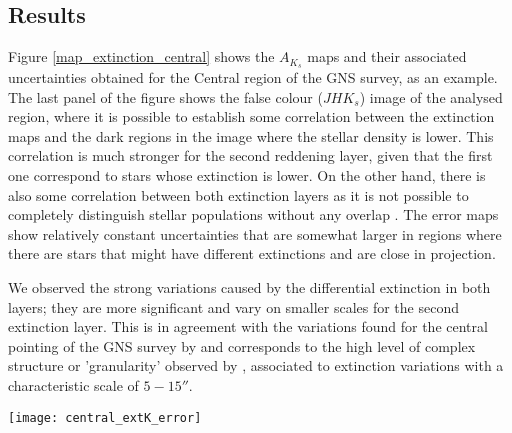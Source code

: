 \documentclass{aa}
\begin{document}
\subsection{Results}

Figure \ref{map_extinction_central} shows the $A_{K_s}$ maps and their associated uncertainties obtained for the Central region of the GNS survey, as an example. The last panel of the figure shows the false colour ($JHK_s$) image of the analysed region, where it is possible to establish some correlation between the extinction maps and the dark regions in the image where the stellar density is lower. This correlation is much stronger for the second reddening layer, given that the first one correspond to stars whose extinction is lower. On the other hand, there is also some correlation between both extinction layers as it is not possible to completely distinguish stellar populations without any overlap \citep[e.g.][]{Nogueras-Lara:2018aa}. The error maps show relatively constant uncertainties that are somewhat larger in regions where there are stars that might have different extinctions and are close in projection.


We observed the strong variations caused by the differential extinction in both layers; they are  more significant and vary on smaller scales for the second extinction layer. This is in agreement with the variations found for the central pointing of the GNS survey by \citet{Nogueras-Lara:2018aa} and corresponds to the high level of complex structure or 'granularity' observed by \citet{Gosling:2006eq}, associated to extinction variations with a characteristic scale of $5-15''$.



   \begin{figure*}[t!]
   \texttt{[image: central\_extK\_error]}
   \caption{Extinction maps $A_{Ks}$ (first column) and associated uncertainties (second column) for the Central region of the GALACTINUCLEUS survey. The scales are different for each panel according to the values of the maps and they are indicated by the colour bar. The dashed rectangles on the upper panels indicate a region where no $J$-band data were available due to bad data quality \citep[for further details, see][]{Nogueras-Lara:2019aa}. White regions indicate that there were not enough stars to assign a value. The lower panel is a false colour image using $JHK_s$ bands. The dashed white lines indicate dark clouds that can be identified in the extinction map corresponding to the second layer.}

   \label{map_extinction_central}
    \end{figure*}
    
\end{document}
